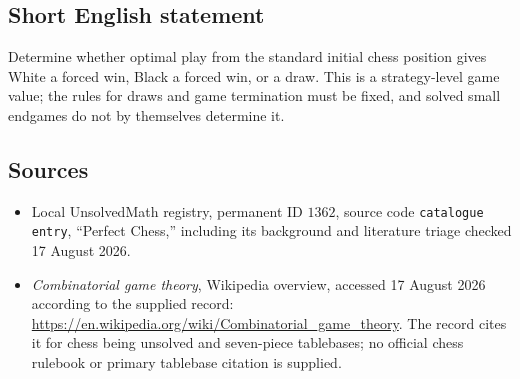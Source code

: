 \documentclass[11pt]{article}
\begin{document}
\subsection{Short English statement}
Determine whether optimal play from the standard initial chess position gives White a forced win, Black a forced win, or a draw. This is a strategy-level game value; the rules for draws and game termination must be fixed, and solved small endgames do not by themselves determine it.
\subsection{Sources}
\begin{itemize}
\item Local UnsolvedMath registry, permanent ID $1362$, source code \texttt{catalogue entry}, ``Perfect Chess,'' including its background and literature triage checked 17 August 2026.
\item \emph{Combinatorial game theory}, Wikipedia overview, accessed 17 August 2026 according to the supplied record: \url{https://en.wikipedia.org/wiki/Combinatorial_game_theory}. The record cites it for chess being unsolved and seven-piece tablebases; no official chess rulebook or primary tablebase citation is supplied.
\end{itemize}
\end{document}
